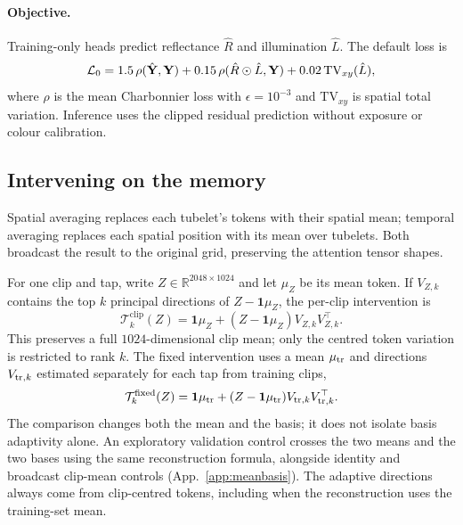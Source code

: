 \paragraph{Objective.}
Training-only heads predict reflectance $\hat R$ and illumination $\hat L$.
The default loss is
\begin{equation}\label{eq:loss}
\mathcal L_0=
1.5\,\rho(\hat{\mathbf{Y}},\mathbf{Y})+
0.15\,\rho(\hat R\odot\hat L,\mathbf{Y})+
0.02\,\mathrm{TV}_{xy}(\hat L),
\end{equation}
where $\rho$ is the mean Charbonnier loss with $\epsilon=10^{-3}$ and
$\mathrm{TV}_{xy}$ is spatial total variation. Inference uses the clipped
residual prediction without exposure or colour calibration.

\subsection{Intervening on the memory}\label{sec:method:interventions}

Spatial averaging replaces each tubelet's tokens with their spatial mean;
temporal averaging replaces each spatial position with its mean over
tubelets. Both broadcast the result to the original grid, preserving the
attention tensor shapes.

For one clip and tap, write $Z\in\mathbb R^{2048\times1024}$ and let
$\mu_Z$ be its mean token. If $V_{Z,k}$ contains the top $k$ principal
directions of $Z-\mathbf1\mu_Z$, the per-clip intervention is
\begin{equation}\label{eq:cliprank}
\mathcal T^{\mathrm{clip}}_k(Z)=
\mathbf1\mu_Z+(Z-\mathbf1\mu_Z)V_{Z,k}V_{Z,k}^{\top}.
\end{equation}
This preserves a full $1024$-dimensional clip mean; only the centred token
variation is restricted to rank $k$.
The fixed intervention uses a mean $\mu_{\rm tr}$ and directions
$V_{{\rm tr},k}$ estimated separately for each tap from training clips,
\begin{equation}\label{eq:globalrank}
\mathcal T^{\mathrm{fixed}}_k(Z)=
\mathbf1\mu_{\rm tr}+
(Z-\mathbf1\mu_{\rm tr})V_{{\rm tr},k}V_{{\rm tr},k}^{\top}.
\end{equation}
The comparison changes both the mean and the basis; it does not isolate basis
adaptivity alone.
An exploratory validation control crosses the two means and the two bases
using the same reconstruction formula, alongside identity and broadcast
clip-mean controls (App.~\ref{app:meanbasis}).
The adaptive directions always come from clip-centred tokens, including when
the reconstruction uses the training-set mean.

